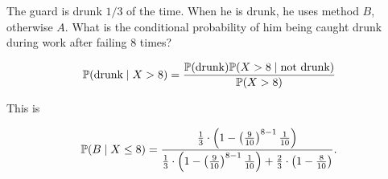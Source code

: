 The guard is drunk \(1/3\) of the time. When he is drunk, he uses method \(B\), otherwise \(A\). What is the conditional probability of him 
being caught drunk during work after failing 8 times? 

\[
    \mathbb{P}(\text{drunk} \mid X > 8) = \frac{\mathbb{P}(\text{drunk}) \mathbb{P}(X > 8 \mid \text{not drunk})}{\mathbb{P}(X > 8)}
\]

This is

\[
    \mathbb{P}(B \mid X \le 8) = \frac{\frac{1}{3} \cdot  \left(1- \left(\frac{9}{10}\right)^{8 - 1} \frac{1}{10} \right) }
    {\frac{1}{3} \cdot  \left(1- \left(\frac{9}{10}\right)^{8 - 1} \frac{1}{10} \right) + \frac{2}{3} \cdot \left(1 -\frac{8}{10} \right)  }.
\]






